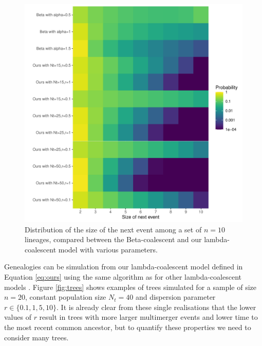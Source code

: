 \documentclass{article}
\begin{document}
\begin{figure}[!p]
\begin{center}
\includegraphics[width=15cm]{../run/figureCompare.pdf}
\end{center}
\caption{Distribution of the size of the next event among a set of $n=10$ lineages, 
compared between the Beta-coalescent and our lambda-coalescent model 
with various parameters.
\label{fig:compare}}
\end{figure}

Genealogies can be simulation from our lambda-coalescent model 
defined in Equation \ref{eq:ours} using the same algorithm
as for other lambda-coalescent models \citep{pitmanCoalescentsMultipleCollisions1999}.
Figure \ref{fig:trees} shows examples of trees simulated for a sample of size $n=20$,
constant population size $N_t=40$ and dispersion parameter $r \in \{0.1,1,5,10\}$. 
It is already clear from these single realisations that the lower values of $r$ result
in trees with more larger multimerger events and lower time to the most recent common ancestor,
but to quantify these properties we need to consider many trees.
\end{document}

